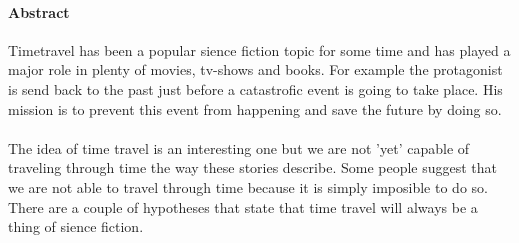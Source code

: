 \paragraph{Abstract} \label{par:Abstract}
Timetravel has been a popular sience fiction topic for some time and has played a major role in plenty of movies, tv-shows and books. For example the protagonist is send back to the past just before a catastrofic event is going to take place. His mission is to prevent this event from happening and save the future by doing so.
\paragraph{}
The idea of time travel is an interesting one but we are not 'yet' capable of traveling through time the way these stories describe. Some people suggest that we are not able to travel through time because it is simply imposible to do so. There are a couple of hypotheses that state that time travel will always be a thing of sience fiction.
